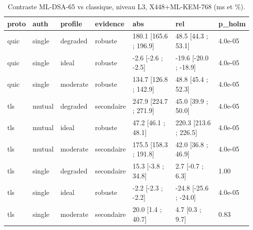 \begin{table}
\caption{Contraste ML-DSA-65 vs classique, niveau L3, X448+ML-KEM-768 (ms et \%).}
\label{tab:principal}
\begin{tabular}{lllllll}
\toprule
proto & auth & profile & evidence & abs & rel & p\_holm \\
\midrule
quic & single & degraded & robuste & 180.1 [165.6 ; 196.9] & 48.5 [44.3 ; 53.1] & 4.0e-05 \\
quic & single & ideal & robuste & -2.6 [-2.6 ; -2.5] & -19.6 [-20.0 ; -18.9] & 4.0e-05 \\
quic & single & moderate & robuste & 134.7 [126.8 ; 142.9] & 48.8 [45.4 ; 52.3] & 4.0e-05 \\
tls & mutual & degraded & secondaire & 247.9 [224.7 ; 271.9] & 45.0 [39.9 ; 50.0] & 4.0e-05 \\
tls & mutual & ideal & robuste & 47.2 [46.1 ; 48.1] & 220.3 [213.6 ; 226.5] & 4.0e-05 \\
tls & mutual & moderate & secondaire & 175.5 [158.3 ; 191.8] & 42.0 [36.8 ; 46.9] & 4.0e-05 \\
tls & single & degraded & secondaire & 15.3 [-3.8 ; 34.8] & 2.7 [-0.7 ; 6.3] & 1.00 \\
tls & single & ideal & robuste & -2.2 [-2.3 ; -2.2] & -24.8 [-25.6 ; -24.0] & 4.0e-05 \\
tls & single & moderate & secondaire & 20.0 [1.4 ; 40.7] & 4.7 [0.3 ; 9.7] & 0.83 \\
\bottomrule
\end{tabular}
\end{table}
